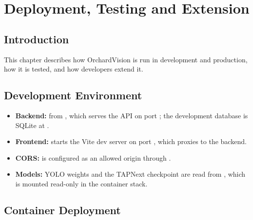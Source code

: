 \chapter{Deployment, Testing and Extension}

\section{Introduction}

This chapter describes how OrchardVision is run in development and production, how it is tested, and how developers extend it.

\section{Development Environment}

\begin{itemize}
  \item \textbf{Backend:}  from , which serves the API on port ; the development database is SQLite at .
  \item \textbf{Frontend:}  starts the Vite dev server on port , which proxies  to the backend.
  \item \textbf{CORS:}  is configured as an allowed origin through .
  \item \textbf{Models:} YOLO weights and the TAPNext checkpoint are read from , which is mounted read-only in the container stack.
\end{itemize}

\section{Container Deployment}


